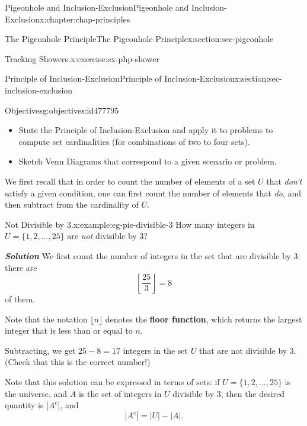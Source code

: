 \documentclass[oneside,10pt,]{book}
\newcommand{\alert}[1]{\textbf{\textit{#1}}}
\newcommand{\terminology}[1]{\textbf{#1}}
\numberwithin{equation}{section}
\begin{document}
\begin{chapterptx}{Pigeonhole and Inclusion-Exclusion}{}{Pigeonhole and Inclusion-Exclusion}{}{}{x:chapter:chap-principles}
\begin{sectionptx}{The Pigeonhole Principle}{}{The Pigeonhole Principle}{}{}{x:section:sec-pigeonhole}
\begin{inlineexercise}{Tracking Showers.}{x:exercise:ex-php-shower}
\begin{enumerate}[label=(\alph*)]
\end{enumerate}
%
\end{inlineexercise}
\end{sectionptx}
%
%
\typeout{************************************************}
\typeout{************************************************}
%
\begin{sectionptx}{Principle of Inclusion-Exclusion}{}{Principle of Inclusion-Exclusion}{}{}{x:section:sec-inclusion-exclusion}
\begin{objectives}{Objectives}{g:objectives:id477795}
%
\begin{itemize}[label=\textbullet]
\item{}State the Principle of Inclusion-Exclusion and apply it to problems to compute set cardinalities (for combinations of two to four sets).%
\item{}Sketch Venn Diagrams that correspond to a given scenario or problem.%
\end{itemize}
\end{objectives}
We first recall that in order to count the number of elements of a set \(U\) that \emph{don't} satisfy a given condition, one can first count the number of elements that \emph{do}, and then subtract from the cardinality of \(U\).%
\begin{example}{Not Divisible by 3.}{x:example:eg-pie-divisible-3}%
How many integers in \(U = \{1,2,\ldots,25\}\) are \emph{not} divisible by 3?%
\par
\alert{Solution} \label{g:notation:id478056} We first count the number of integers in the set that are divisible by 3: there are%
\begin{equation*}
\left\lfloor \frac{25}{3}\right\rfloor = 8
\end{equation*}
of them.%
\par
Note that the notation \(\lfloor n \rfloor\) denotes the \terminology{floor function}, which returns the largest integer that is less than or equal to \(n\).%
\par
Subtracting, we get \(25 - 8 = 17\) integers in the set \(U\) that are not divisible by 3. (Check that this is the correct number!)%
\end{example}
Note that this solution can be expressed in terms of sets: if \(U = \{1,2,\ldots,25\}\) is the universe, and \(A\) is the set of integers in \(U\) divisible by 3, then the desired quantity is \(|A^c|\), and%
\begin{equation*}
|A^c| = |U| - |A|\text{.}
\end{equation*}

\end{sectionptx}
\end{chapterptx}
\end{document}
